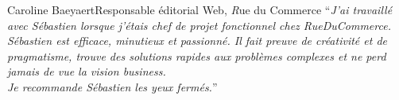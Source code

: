 \documentclass[]{friggeri}
\begin{document}
\begin{quoting}{Caroline Baeyaert}{Responsable éditorial Web, {\emph Rue du Commerce}}
``\textit{J'ai travaillé avec Sébastien lorsque j'étais chef de projet fonctionnel
chez RueDuCommerce. Sébastien est efficace, minutieux et passionné. Il fait
preuve de créativité et de pragmatisme, trouve des solutions rapides aux
problèmes complexes et ne perd jamais de vue la vision business.\\
Je recommande Sébastien les yeux fermés.}''
\end{quoting}
\end{document}
